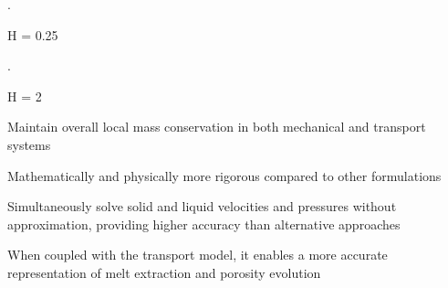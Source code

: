 \documentclass[usenames,dvipsnames,letterpaper,landscape,final]{slides}
\theoremstyle{definition}
\begin{document}
\begin{myslide}

		  \parbox{0.3\textwidth}{\raggedright
		  .

		  H = 0.25
		  }\parbox{0.7\textwidth}{\raggedright
  \centering

  \centering
		  }

\end{myslide}

\begin{myslide}

		  \parbox{0.3\textwidth}{\raggedright
		  .

		  H = 2
		  }\parbox{0.7\textwidth}{\raggedright

  \centering

  \centering
		  }

\end{myslide}

\begin{myslide}

		  \begin{blist}
		  \item Maintain overall local mass conservation in both mechanical and transport systems
					 \vspace{0.5cm}
		  \item Mathematically and physically more rigorous compared to other formulations
					 \vspace{0.5cm}
		  \item Simultaneously solve solid and liquid velocities and pressures without approximation, providing higher accuracy than alternative approaches
					 \vspace{0.5cm}
		  \item When coupled with the transport model, it enables a more accurate representation of melt extraction and porosity evolution
		  \end{blist}

\end{myslide}
\end{document}
